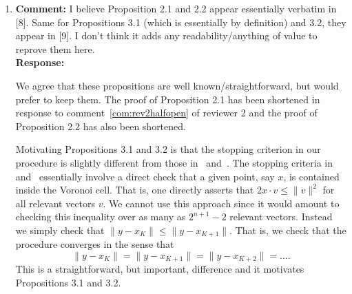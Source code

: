 \documentclass[a4paper,10pt]{article}
\begin{document}
\begin{enumerate}

\item\textbf{Comment:} 
I believe Proposition 2.1 and 2.2 appear essentially verbatim in [8]. Same for Propositions
3.1 (which is essentially by definition) and 3.2, they appear in [9]. I don’t think it adds any
readability/anything of value to reprove them here.
\\\textbf{Response:}

We agree that these propositions are well known/straightforward, but would prefer to keep them. %
The proof of Proposition 2.1 has been shortened in response to comment~\ref{com:rev2halfopen} of reviewer 2 and the proof of Proposition 2.2 has also been shortened.  %

Motivating Propositions 3.1 and 3.2 is that the stopping criterion in our procedure is slightly different from those in~\cite{Shalvi_iterativeslicer_2009} and~\cite{MicciancioVoulgaris_deterministic_jv_2013}.  The stopping criteria in~\cite{Shalvi_iterativeslicer_2009} and~\cite{MicciancioVoulgaris_deterministic_jv_2013} essentially involve a direct check that a given point, say $x$, is contained inside the Voronoi cell.  That is, one directly asserts that $2 x \cdot v \leq \|v\|^2$ for all relevant vectors $v$.  We cannot use this approach since it would amount to checking this inequality over as many as $2^{n+1}-2$ relevant vectors.  Instead we simply check that $\|y - x_K\| \leq \|y - x_{K+1}\|$.  That is, we check that the procedure converges in the sense that 
\[
\|y - x_K\| = \|y - x_{K+1}\| = \|y - x_{K+2}\| = \dots.
\]
This is a straightforward, but important, difference and it motivates Propositions 3.1 and 3.2.


\end{enumerate}
\end{document}
